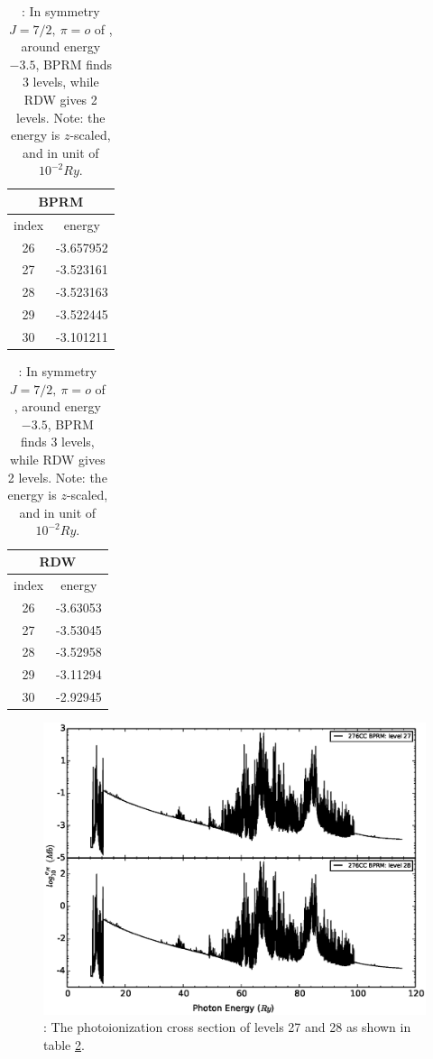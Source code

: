 \begin{table}
	\centering
	\caption{: In symmetry $J = 7/2,~\pi = o$ of , around energy $-3.5$, BPRM finds 3 levels, while RDW gives 2 levels. Note: the energy is $z$-scaled, and in unit of $10^{-2} Ry$.}
	\begin{tabular}{|c|c|}
		\hline
		\multicolumn{2}{|c|}{BPRM} \\
		\hline
		index & energy \\	
		\hline
		26 & -3.657952 \\
		27 & -3.523161 \\
		28 & -3.523163 \\
		29 & -3.522445 \\
		30 & -3.101211 \\	
		\hline	
	\end{tabular}
	\quad
	\begin{tabular}{|c|c|}
		\hline
		\multicolumn{2}{|c|}{RDW} \\
		\hline
		index & energy \\	
		\hline
		26 & -3.63053 \\
		27 & -3.53045 \\
		28 & -3.52958 \\
		29 & -3.11294 \\
		30 & -2.92945 \\	
		\hline	
	\end{tabular}
	\label{table_fake_level}
\end{table}

\begin{figure}
	\centering
	\includegraphics[width=.9\textwidth]{figures/fe18_fake_levels.eps}	
	\caption{: The photoionization cross section of levels 27 and 28 as shown in table \ref{table_fake_level}.}
	\label{figure_fake_level}
\end{figure}




